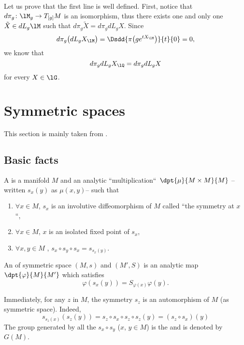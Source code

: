 Let us prove that the first line is well defined. First, notice that $d\pi_g\colon \lM_g\to T_{[g]}M$ is an isomorphism, thus there exists one and only one $\tilde X\in dL_g\lM$ such that $d\pi_g \tilde X=d\pi_gdL_g X$. Since
\begin{equation}
	d\pi_g\big( dL_g X_{\lM} \big)=\Dsdd{ \pi\big( g e^{tX_{\lM}} \big) }{t}{0}=0,
\end{equation}
we know that
\begin{equation}
	d\pi_gdL_g X_{\lQ}=d\pi_gdL_g X
\end{equation}
for every $X\in \lG$.

\section{Symmetric spaces}\label{sec:symm}
This section is mainly taken from \cite{Loos,Dixmier,SSSSS,Dieu2}.

\subsection{Basic facts}

\begin{definition} 
A  is a manifold $M$ and an analytic ``multiplication``\ $\dpt{\mu}{M\times M}{M}$ --written $s_x(y)$ as $\mu(x,y)$-- such that

\begin{enumerate}
\item $\forall x\in M$, $s_x$ is an involutive diffeomorphism of $M$ called ``the symmetry at $x$ ``,

\item $\forall x\in M$, $x$ is an isolated fixed point of $s_x$,
\item $\forall x,y\in M$ , $s_x\circ s_y\circ s_x=s_{s_x(y)}$.
\end{enumerate}
\label{def:esp_sym}
\end{definition}
\begin{definition}
An  of symmetric space $(M,s)$ and $(M',S)$ is an analytic map $\dpt{\varphi}{M}{M'}$ which satisfies
\[
    \varphi( s_x(y) )=S_{\varphi(x)}\varphi(y).
\]
\end{definition}

Immediately, for any $z$ in $M$, the symmetry $s_z$ is an automorphism of $M$ (as symmetric space). Indeed,
\begin{equation}
  s_{s_z(x)}(s_z(y))=s_z\circ s_x\circ s_z\circ s_z(y)
                    =(s_z\circ s_x)(y)
\end{equation}
The group generated by all the $s_x\circ s_y$ ($x$, $y\in M$) is the  and is denoted by $G(M)$.

